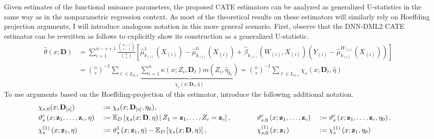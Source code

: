 Given estimates of the functional nuisance parameters, the proposed CATE estimators can be analyzed as generalized U-statistics in the same way as in the nonparametric regression context.
As most of the theoretical results on these estimators will similarly rely on Hoeffding projection arguments, I will introduce analogous notation in this more general scenario.
First, observe that the DNN-DML2 CATE estimator can be rewritten as follows to explicitly show its construction as a generalized U-statistic.
\begin{equation}
    \begin{aligned}
        \hat{\theta}\left(x; \mathbf{D}\right) 
        & = \sum_{i = 1}^{n - s + 1} \frac{\binom{n-i}{s-1}}{\binom{n}{s}}
		\left[\hat{\mu}_{k_{(i)}}^{1}\left(X_{(i)}\right) - \hat{\mu}_{k_{(i)}}^{0}\left(X_{(i)}\right) + \hat{\beta}_{k_{(i)}}\left(W_{(i)}, X_{(i)}\right)\left(Y_{(i)} - \hat{\mu}^{W_{(i)}}_{k_{(i)}}\left(X_{(i)}\right)\right)\right] \\
        & = \binom{n}{s}^{-1} \sum_{\ell \in L_{n,s}}
        \underbrace{\sum_{i = 1}^{n}\kappa(x; Z_{i}, \mathbf{D}_{\ell}) 
        m(Z_{i}, \hat{\eta}_{k_i})}_{\chi_{s}(x; \mathbf{D}_{\ell}, \hat{\eta})}
        = \binom{n}{s}^{-1} \sum_{\ell \in L_{n,s}}\chi_{s}(x; \mathbf{D}_{\ell}, \hat{\eta})
    \end{aligned}
\end{equation}
To use arguments based on the Hoeffding-projection of this estimator, introduce the following additional notation.
\begin{alignat}{4}
    &\chi_{s, 0}(x; \mathbf{D}_{[s]})
    & \; := \; &\chi_{s}(x; \mathbf{D}_{[s]}, \eta_{0}),\\
    &\vartheta_{s}^{c}\left(x; \mathbf{z}_{1}, \dotsc, \mathbf{z}_{c}, \eta\right)
    & \; := \; &\mathbb{E}_{D}\left[\chi_{s}(x; \mathbf{D}, \eta) \, \middle| \, Z_1 = \mathbf{z}_1, \dotsc, Z_c = \mathbf{z}_c\right], &
    \hspace{1cm}
    &\vartheta_{s,0}^{c}\left(x; \mathbf{z}_{1}, \dotsc, \mathbf{z}_{c}\right)
    & \; := \; &\vartheta_{s}^{c}\left(x; \mathbf{z}_{1}, \dotsc, \mathbf{z}_{c}, \eta_{0}\right), \\
    &\chi_{s}^{(1)}\left(x; \mathbf{z}_{1}, \eta\right)
	& \; := \; &\vartheta_{s}^{1}\left(x; \mathbf{z}_{1}, \eta\right)
    - \mathbb{E}_{D}\left[\chi_{s}(x; \mathbf{D}, \eta)\right], &
    \hspace{1cm}
    &\chi_{s,0}^{(1)}\left(x; \mathbf{z}_{1}\right)
	& \; := \; &\chi_{s}^{(1)}\left(x; \mathbf{z}_{1}, \eta_{0}\right)
\end{alignat}
